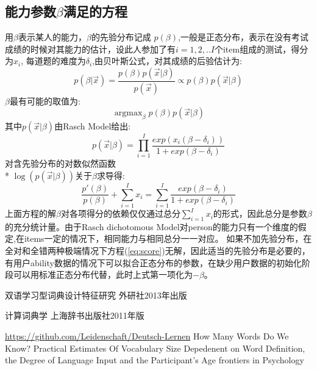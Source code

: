 \documentclass[12pt]{article}
\DeclareMathOperator*{\argmax}{argmax}
\begin{document}
\subsection{能力参数$\beta$满足的方程}\label{A3}
用$\beta$表示某人的能力，$\beta$的先验分布记成
$p(\beta)$,一般是正态分布，表示在没有考试成绩的时候对其能力的估计，设此人参加了有$i=1,2,..I$个item组成的测试，得分为$x_i$,
每道题的难度为$\delta_i$,由贝叶斯公式，对其成绩的后验估计为:
\begin{equation}
p(\beta|\vec{x})=\frac{p(\beta)p(\vec{x}|\beta)}{p(\vec{x})}\propto p(\beta)p(\vec{x}|\beta)
\end{equation}
$\beta$最有可能的取值为:
\begin{equation}
\argmax_{\beta} p(\beta)p(\vec{x}|\beta)
\end{equation}
其中$p(\vec{x}|\beta)$由Rasch Model给出:
\begin{equation}
p(\vec{x}|\beta)=\prod_{i=1}^I \frac{exp(x_i(\beta-\delta_i))}{1+exp(\beta-\delta_i)}
\end{equation}
对含先验分布的对数似然函数\\*
$\log(p(\vec{x}|\beta))$关于$\beta$求导得:
\begin{equation}\label{eq:score}
\frac{p'(\beta)}{p(\beta)}+\sum_{i=1}^I x_i =\sum_{i=1}^I \frac{exp(\beta-\delta_i)}{1+exp(\beta-\delta_i)}
\end{equation}
上面方程的解$\beta$对各项得分的依赖仅仅通过总分$\sum_{i=1}^I x_i$的形式，因此总分是参数$\beta$的充分统计量。由于Rasch  dichotomous Model对person的能力只有一个维度的假定,在items一定的情况下，相同能力与相同总分一一对应。
如果不加先验分布，在全对和全错两种极端情况下方程(\ref{eq:score})无解，因此适当的先验分布是必要的，有用户ability数据的情况下可以拟合正态分布的参数，在缺少用户数据的初始化阶段可以用标准正态分布代替，此时上式第一项化为$-\beta$。

\begin{thebibliography}{}
双语学习型词典设计特征研究 外研社2013年出版

 计算词典学 上海辞书出版社2011年版

 \url{https://github.com/Leidenschaft/Deutsch-Lernen}
 How Many Words Do We Know? Practical Estimates Of
Vocabulary Size Depedenent on Word Definition, the Degree of Language Input and the Participant's Age		frontiers in Psychology
\end{thebibliography}
\end{document}
